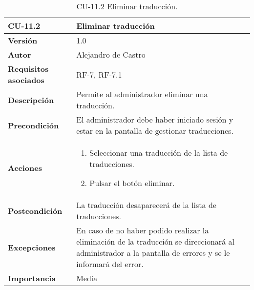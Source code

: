 \begin{table}[p]
	\centering
	\begin{tabularx}{\linewidth}{ p{} p{} }
		\toprule
		\textbf{CU-11.2}    & \textbf{Eliminar traducción}\\
		\toprule
		\textbf{Versión}              & 1.0    \\
		\textbf{Autor}                & {Alejandro de Castro} \\
		\textbf{Requisitos asociados} & RF-7, RF-7.1 \\
		\textbf{Descripción}          & Permite al administrador eliminar una traducción. \\
		\textbf{Precondición}         & El administrador debe haber iniciado sesión y estar en la pantalla de gestionar traducciones. \\
        \textbf{Acciones}             &
		\begin{enumerate}
			\def\labelenumi{\arabic{enumi}.}
			\tightlist
            \item Seleccionar una traducción de la lista de traducciones.
			\item Pulsar el botón eliminar.
		\end{enumerate}\\ 
		\textbf{Postcondición}        & La traducción desaparecerá de la lista de traducciones. \\
		\textbf{Excepciones}          & En caso de no haber podido realizar la eliminación de la traducción se direccionará al administrador a la pantalla de errores y se le informará del error. \\
		\textbf{Importancia}          & Media \\
		\bottomrule
	\end{tabularx}
	\caption{CU-11.2 Eliminar traducción.}
\end{table}